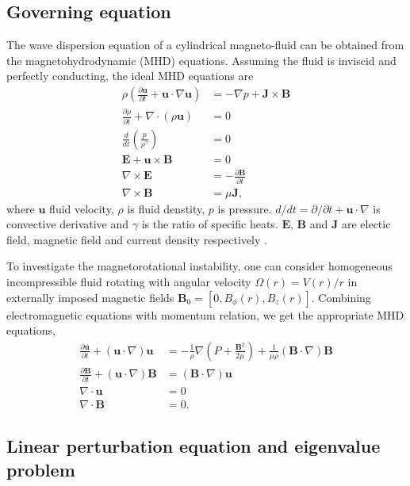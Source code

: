 \documentclass{jfm}
\newcommand{\del}{\nabla}
\begin{document}
%
%
\subsection{Governing equation}

The wave dispersion equation of a cylindrical magneto-fluid can be obtained 
from the magnetohydrodynamic (MHD) equations. Assuming the fluid is inviscid 
and perfectly conducting, the ideal MHD equations are 
\begin{align}
    \rho\left(\frac{\partial\mathbf{u}}{\partial t}+\mathbf{u}\cdot\del\mathbf{u}\right) &= -\del p +\mathbf{J}\times\mathbf{B} \\
    \frac{\partial \rho}{\partial t} + \del\cdot(\rho \mathbf{u})&=0 \\
    \frac{d}{dt}\left(\frac{p}{\rho^\gamma}\right)&=0\\
    \mathbf{E}+\mathbf{u}\times\mathbf{B}&=0 \\
    \del\times \mathbf{E} &= -\frac{\partial \mathbf{B}}{\partial t} \\
    \del \times \mathbf{B} &= \mu \mathbf{J},
\end{align}
where $\mathbf{u}$ fluid velocity, $\rho$ is fluid denstity, $p$ is pressure. 
$d/dt=\partial/\partial t +\mathbf{u}\cdot\del$ is convective derivative and 
$\gamma$ is the ratio of specific heats. $\mathbf{E}$, $\mathbf{B}$ and 
$\mathbf{J}$ are electic field, magnetic field and current density respectively
\citep{Freidberg1987}.

To investigate the magnetorotational instability, one can consider homogeneous
incompressible fluid rotating 
with angular velocity $\Omega(r)=V(r) / r$ in externally imposed magnetic 
fields $\mathbf{B}_0 = [0,B_\phi(r),B_z(r)]$. Combining electromagnetic 
equations with momentum relation, we get the appropriate MHD equations,
\begin{align}
    \frac{\partial \mathbf{u}}{\partial t}+(\mathbf{u}\cdot\del)\mathbf{u} &= -\frac{1}{\rho}\del\left(P+\frac{\mathbf{B}^2}{2\mu}\right)+\frac{1}{\mu\rho}(\mathbf{B}\cdot\del)\mathbf{B}\\
    \frac{\partial \mathbf{B}}{\partial t} +(\mathbf{u}\cdot\del)\mathbf{B} &=(\mathbf{B}\cdot\del)\mathbf{u} \\
    \del\cdot\mathbf{u}&=0\\
    \del \cdot \mathbf{B} &=0.
\end{align}


%
%
\subsection{Linear perturbation equation and eigenvalue problem}
\end{document}
